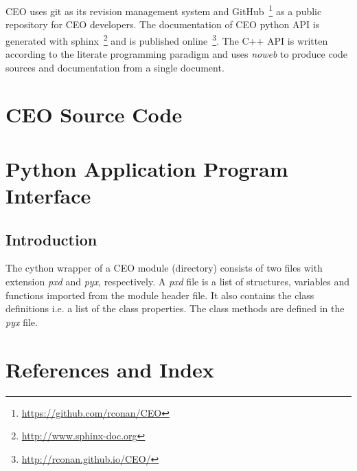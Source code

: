 \documentclass[oldfontcommands]{memoir}
\begin{document}
CEO uses git as its revision management system and
GitHub~\footnote{\url{https://github.com/rconan/CEO}} as a public repository for
CEO developers. 
The documentation of CEO python API is generated with
sphinx~\footnote{\url{http://www.sphinx-doc.org}} and is published
online~\footnote{\url{http://rconan.github.io/CEO/}}.
The C++ API is written according to the literate programming paradigm and uses
\emph{noweb}\cite{noweb} to produce code sources and documentation from a single document.
%
\clearpage
\thispagestyle{empty}
    \label{ceoflow}
\clearpage

\part{CEO Source Code}



\part{Python Application Program Interface}

\chapter{Introduction}

The cython wrapper of a CEO module (directory) consists of two files with extension \emph{pxd} and \emph{pyx}, respectively.
A \emph{pxd} file is a list of structures, variables and functions imported from the module header file.
It also contains the class definitions i.e. a list of the class properties.
The class methods are defined in the \emph{pyx} file.



\part{References and Index}



%

\printindex
\end{document}

